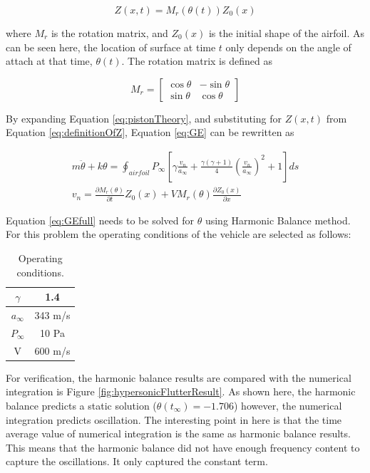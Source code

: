 \documentclass[12pt, a4paper]{extarticle}
\begin{document}
\begin{equation}\label{eq:definitionOfZ}
	Z(x,t) = M_r\left( \theta(t) \right) Z_0(x)
\end{equation}

where $M_r$ is the rotation matrix, and $Z_0(x)$ is the initial shape of the airfoil.  As can be seen here, the location of surface at time $t$ only depends on the angle of attach at that time, $\theta(t)$. The rotation matrix is defined as

\begin{equation*}
	M_r = 
	\begin{bmatrix}
		\cos \theta & -\sin \theta \\
		\sin \theta & \cos \theta
	\end{bmatrix}
\end{equation*}

By expanding Equation \eqref{eq:pistonTheory}, and substituting for $Z(x,t)$ from Equation \eqref{eq:definitionOfZ}, Equation \eqref{eq:GE} can be rewritten as

\begin{subequations}
\begin{gather}
	m\ddot{\theta} + k \theta = 
	\oint_{airfoil} P_\infty
	\left[
	\gamma \frac{v_n}{a_\infty} +
	\frac{\gamma (\gamma + 1)}{4} \left( \frac{v_n}{a_\infty}\right)^2 +
	1
	\right] ds
	\\
	v_n = 
	\frac{\partial M_r(\theta)}{\partial t}Z_0(x) + V M_r(\theta)\frac{\partial Z_0(x)}{\partial x}
\end{gather}\label{eq:GEfull}
\end{subequations}

Equation \eqref{eq:GEfull} needs to be solved for $\theta$ using Harmonic Balance method. For this problem the operating conditions of the vehicle are selected as follows:

\begin{table}[htbp]
\begin{center}
\begin{tabular}{c|c}
	$\gamma$ & 1.4 \\ \hline
	$a_\infty$ & 343 m/s \\ \hline
	$P_\infty$ & 10 Pa \\ \hline
	V & 600 m/s \\
	\end{tabular}
	\end{center}
	\caption{Operating conditions.}
\end{table}

For verification, the harmonic balance results are compared with the numerical integration is Figure \eqref{fig:hypersonicFlutterResult}. As shown here, the harmonic balance predicts a static solution ($\theta(t_\infty) = -1.706$) however, the numerical integration predicts oscillation. The interesting point in here is that the time average value of numerical integration is the same as harmonic balance results. This means that the harmonic balance did not have enough frequency content to capture the oscillations. It only captured the constant term.
\end{document}
